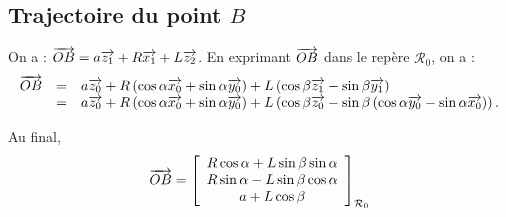 \documentclass[10pt,fleqn]{article} %
\begin{document}
\subsection{Trajectoire du point $B$}
On a : $\overrightarrow{OB} = a \overrightarrow{z_{1}} + R \overrightarrow{x_{1}} + L \overrightarrow{z_{2}}$. En exprimant $\overrightarrow{OB}$ dans le repère $\mathcal{R}_0$, on a : 
$$
\begin{array}{ccl}
\overrightarrow{OB} &=& a \overrightarrow{z_{0}} + R \left( \cos\alpha \overrightarrow{x_{0}} + \sin \alpha \overrightarrow{y_{0}} \right) + L \left( \cos \beta \overrightarrow{z_{1}} - \sin \beta \overrightarrow{y_{1}} \right) \\
 & = & a \overrightarrow{z_{0}} + R \left( \cos\alpha \overrightarrow{x_{0}} + \sin \alpha \overrightarrow{y_{0}} \right) + L \left( \cos \beta \overrightarrow{z_{0}} - \sin \beta \left( \cos\alpha \overrightarrow{y_{0}} - \sin \alpha \overrightarrow{x_{0}} \right) \right). \\
\end{array}
$$

Au final, 
$$
\overrightarrow{OB} = \left[
\begin{array}{c}
R  \cos\alpha + L\sin \beta\sin \alpha\\ 
R  \sin \alpha -L\sin \beta\cos\alpha\\
a + L\cos \beta 
\end{array}
\right]_{\mathcal{R}_0}
$$


\end{document}
